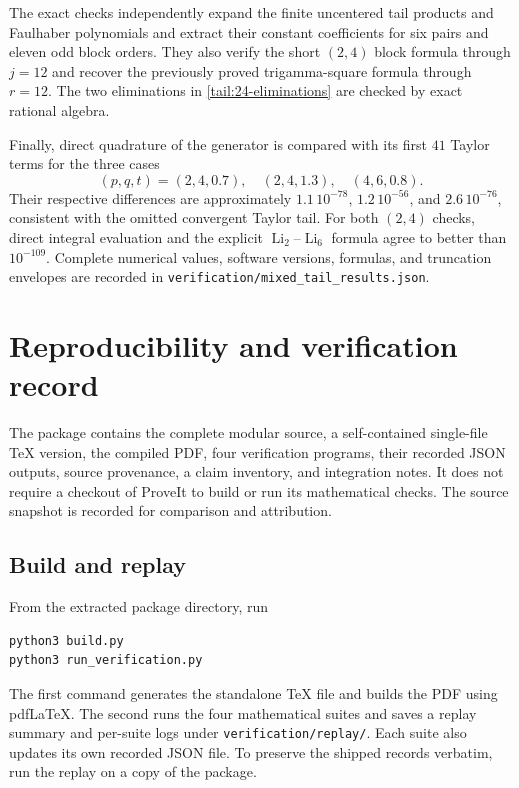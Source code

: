 \documentclass[11pt,a4paper]{article}
\numberwithin{equation}{section}
\theoremstyle{definition}
\theoremstyle{remark}
\begin{document}
The exact checks independently expand the finite uncentered tail
products and Faulhaber polynomials and extract their constant
coefficients for six pairs and eleven odd block orders. They also
verify the short \((2,4)\) block formula through \(j=12\) and
recover the previously proved trigamma-square formula through
\(r=12\). The two eliminations in
\eqref{tail:24-eliminations} are checked by exact rational algebra.

Finally, direct quadrature of the generator is compared with its
first \(41\) Taylor terms for the three cases
\[
 (p,q,t)=(2,4,0.7),\quad (2,4,1.3),\quad (4,6,0.8).
\]
Their respective differences are approximately
\(1.1\,10^{-78}\), \(1.2\,10^{-56}\), and
\(2.6\,10^{-76}\), consistent with the omitted convergent Taylor
tail. For both \((2,4)\) checks, direct integral evaluation and
the explicit \(\operatorname{Li}_2\)--\(\operatorname{Li}_6\)
formula agree to better than \(10^{-109}\). Complete numerical
values, software versions, formulas, and truncation envelopes are
recorded in \texttt{verification/mixed\_tail\_results.json}.




\section{Reproducibility and verification record}
\label{repro:section}

The package contains the complete modular source, a self-contained
single-file TeX version, the compiled PDF, four verification
programs, their recorded JSON outputs, source provenance, a claim
inventory, and integration notes. It does not require a checkout
of ProveIt to build or run its mathematical checks. The source
snapshot is recorded for comparison and attribution.

\subsection{Build and replay}

From the extracted package directory, run
\begin{verbatim}
python3 build.py
python3 run_verification.py
\end{verbatim}
The first command generates the standalone TeX file and builds the
PDF using pdfLaTeX. The second runs the four mathematical suites
and saves a replay summary and per-suite logs under
\texttt{verification/replay/}. Each suite also updates its own
recorded JSON file. To preserve the shipped records verbatim,
run the replay on a copy of the package.
\end{document}
